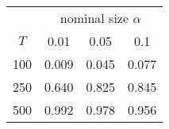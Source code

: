 % 
\begin{tabular}{cccc}
  \hline
  & \multicolumn{3}{c}{nominal size $\alpha$} \\
 $T$ & 0.01 & 0.05 & 0.1 \\
 \hline
100 & 0.009 & 0.045 & 0.077 \\ 
  250 & 0.640 & 0.825 & 0.845 \\ 
  500 & 0.992 & 0.978 & 0.956 \\ 
   \hline
\end{tabular}
